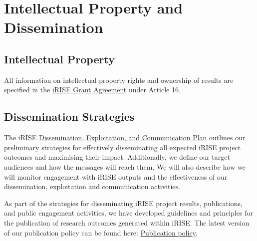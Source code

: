 \documentclass[
]{article}
\begin{document}
\hypertarget{intellectual-property-and-dissemination}{%
\section{\texorpdfstring{\textbf{Intellectual Property and Dissemination}}{Intellectual Property and Dissemination}}\label{intellectual-property-and-dissemination}}

\hypertarget{intellectual-property}{%
\subsection{Intellectual Property}\label{intellectual-property}}

All information on intellectual property rights and ownership of results are specified in the \href{https://charitede.sharepoint.com/:f:/r/sites/iRISE/Shared\%20Documents/General/Grant\%20Agreement/AMD-101094853-4_Nov2023?csf=1\&web=1\&e=cuFpdE}{iRISE Grant Agreement} under Article 16.

\hypertarget{dissemination-strategies}{%
\subsection{Dissemination Strategies}\label{dissemination-strategies}}

The iRISE \href{https://charitede.sharepoint.com/:w:/r/sites/iRISE/Shared\%20Documents/WP6/iRISE\%20Dissemination\%20Plan_Draft\%201.2.docx?d=w7a63d0ea4a374c1bbe3b7fd98d0c7d2f\&csf=1\&web=1\&e=jY54DT}{Dissemination, Exploitation, and Communication Plan} outlines our preliminary strategies for effectively disseminating all expected iRISE project outcomes and maximising their impact. Additionally, we define our target audiences and how the messages will reach them. We will also describe how we will monitor engagement with iRISE outputs and the effectiveness of our dissemination, exploitation and communication activities.

As part of the strategies for disseminating iRISE project results, publications, and public engagement activities, we have developed guidelines and principles for the publication of research outcomes generated within iRISE. The latest version of our publication policy can be found here: \href{https://charitede.sharepoint.com/:w:/r/sites/iRISE/_layouts/15/Doc.aspx?sourcedoc=\%7BD202FA5E-EDE0-432A-84C6-96659F1B420E\%7D\&file=iRISE_Publication_Policy_2023-09-07_draft_v1.docx\&action=default\&mobileredirect=true}{Publication policy}.
\end{document}
